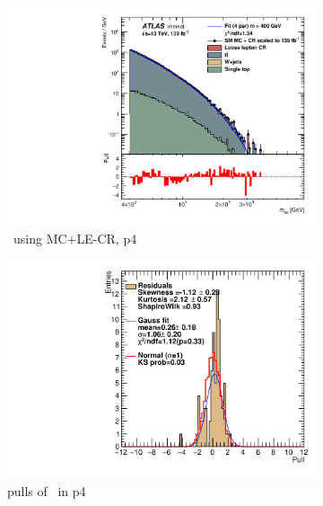 \begin{figure}[H]
    \centering
    \begin{subfigure}[h]{0.38\linewidth}
    \includegraphics[scale=0.3]{figs/ch6/fit/variable_nosmooth/p4/10PB/output_SMMCplusCR_Mbb_p4.pdf}%
    \caption{\mbb \ using MC+LE-CR, p4}
    \end{subfigure}
    \hfill
    \begin{subfigure}[h]{0.4\linewidth}
    \includegraphics[scale=0.32]{figs/ch6/fit/variable_nosmooth/p4/10PB/pull_SMMCplusCR_Mbb_p4.pdf}%
    \caption{pulls of \mbb \ in p4}
    \end{subfigure}
    \hfill
    \begin{subfigure}[h]{0.38\linewidth}

\end{subfigure}
\end{figure}
